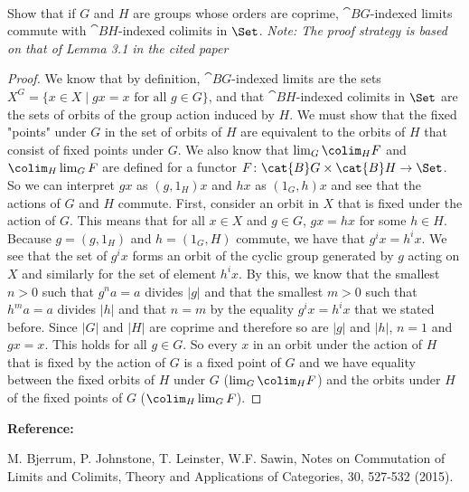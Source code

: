 \documentclass[main.tex]{subfiles}
\begin{document}
\paragraph{}

\begin{exercise}
 Show that if $G$ and $H$ are groups whose orders are coprime, $\cat{B}G$-indexed limits commute with $\cat{B}H$-indexed colimits in $\Set$.
\textit{Note: The proof strategy is based on that of Lemma 3.1 in the cited paper}
\end{exercise}

\begin{proof}
We know that by definition, $\cat{B}G$-indexed limits are the sets $X^{G} =
\{x \in X \mid gx = x \text{ for all } g \in G\}$, and that  $\cat{B}H$-indexed
colimits in $\Set$ are the sets of orbits of the group action induced by $H$.
We must show that the fixed "points" under $G$ in the set of orbits of $H$ are
equivalent to the orbits of $H$ that consist of fixed points under $G$. We also
know that $\lim_{G}\colim_{H} F $ and $\colim_{H}\lim_{G} F$ are defined for a
functor $F\colon \cat{B}G \times \cat{B}H \rightarrow \Set$. So we can
interpret $gx$ as $(g,1_H)x$ and $hx$ as $(1_G, h)x$ and see that the actions
of $G$ and $H$ commute.
First, consider an orbit in  $X$ that is fixed under the action of $G$. This
means that for all $x \in X$ and $g \in G$, $gx = hx$ for some $h \in H$.
Because $g = (g,1_H)$ and $h = (1_G,H)$ commute, we have that $g^{i}x =
h^{i}x$. We see that the set of $g^{i}x$ forms an orbit of the cyclic group
generated by $g$ acting on $X$ and similarly for the set of element $h^{i}x$.
By this, we know that the  smallest $n > 0$ such that $g^{n}a = a$ divides
$|g|$ and that the  smallest $m > 0$ such that $h^{m}a = a$ divides $|h|$ and
that $n = m$ by the equality $g^{i}x = h^{i}x$ that we stated before. Since
$|G|$ and $|H|$ are coprime and therefore so are $|g|$ and $|h|$, $n = 1$ and
$gx = x$. This holds for all $g \in G$. So every $x$ in an orbit under the
action of $H$ that is fixed by the action of $G$ is a fixed point of $G$ and we
have equality between the fixed orbits of $H$ under $G$ ($\lim_{G}\colim_{H} F
$) and the orbits under $H$ of the fixed points of $G$ ($\colim_{H}\lim_{G}
F$).
\end{proof}
\textbf{Reference:}

M. Bjerrum, P. Johnstone, T. Leinster, W.F. Sawin, Notes on Commutation of Limits and Colimits, Theory and Applications of Categories, 30, 527-532 (2015).
\end{document}
